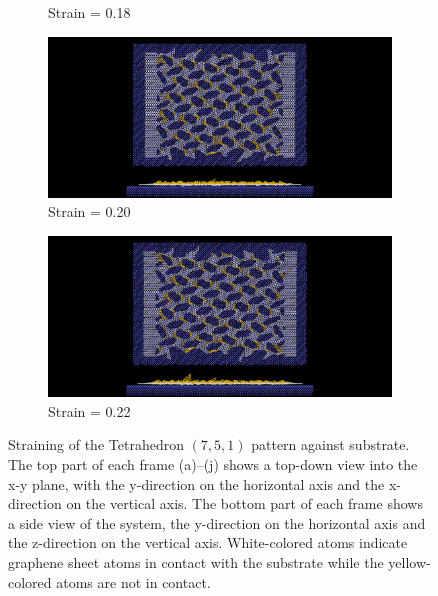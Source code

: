 \begin{figure}[H]
\begin{subfigure}[b]{0.49\textwidth}
        \caption{Strain = 0.18}
    \end{subfigure}
    \begin{subfigure}[b]{0.49\textwidth}
        \centering
        \includegraphics[width=\textwidth]{figures/baseline/contact_vs_stretch/popup/pop_stretch0020.png}
        \caption{Strain = 0.20}
    \end{subfigure}
    \begin{subfigure}[b]{0.49\textwidth}
        \centering
        \includegraphics[width=\textwidth]{figures/baseline/contact_vs_stretch/popup/pop_stretch0022.png}
        \caption{Strain = 0.22}
        \label{fig:tetrahedron_strain_j}
    \end{subfigure}
    \hfill
       \caption{Straining of the Tetrahedron $(7,5,1)$ pattern against substrate. The top part of each frame (a)--(j) shows a top-down view into the x-y plane, with the y-direction on the horizontal axis and the x-direction on the vertical axis. The bottom part of each frame shows a side view of the system, the y-direction on the horizontal axis and the z-direction on the vertical axis. White-colored atoms indicate graphene sheet atoms in contact with the substrate while the yellow-colored atoms are not in contact.}
       \label{fig:tetrahedron_strain}
  \end{figure}

